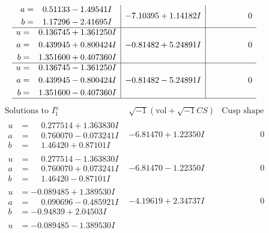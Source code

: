 \documentclass[1p]{elsarticle_modified}
\theoremstyle{definition}
\newcommand{\I}{\sqrt{-1}}
\begin{document}
$$\begin{array}{c|c|c}
\begin{aligned}
a &= \phantom{-}0.51133 - 1.49541 I \\
b &= \phantom{-}1.17296 - 2.41695 I\end{aligned}
 & -7.10395 + 1.14182 I & \phantom{-0.000000 } 0 \\ \hline\begin{aligned}
u &= \phantom{-}0.136745 + 1.361250 I \\
a &= \phantom{-}0.439945 + 0.800424 I \\
b &= \phantom{-}1.351600 + 0.407360 I\end{aligned}
 & -0.81482 + 5.24891 I & \phantom{-0.000000 } 0 \\ \hline\begin{aligned}
u &= \phantom{-}0.136745 - 1.361250 I \\
a &= \phantom{-}0.439945 - 0.800424 I \\
b &= \phantom{-}1.351600 - 0.407360 I\end{aligned}
 & -0.81482 - 5.24891 I & \phantom{-0.000000 } 0\\
 \hline 
 \end{array}$$\newpage$$\begin{array}{c|c|c}  
\text{Solutions to }I^u_{1}& \I (\text{vol} + \sqrt{-1}CS) & \text{Cusp shape}\\
 \hline 
\begin{aligned}
u &= \phantom{-}0.277514 + 1.363830 I \\
a &= \phantom{-}0.760070 - 0.073241 I \\
b &= \phantom{-}1.46420 + 0.87101 I\end{aligned}
 & -6.81470 + 1.22350 I & \phantom{-0.000000 } 0 \\ \hline\begin{aligned}
u &= \phantom{-}0.277514 - 1.363830 I \\
a &= \phantom{-}0.760070 + 0.073241 I \\
b &= \phantom{-}1.46420 - 0.87101 I\end{aligned}
 & -6.81470 - 1.22350 I & \phantom{-0.000000 } 0 \\ \hline\begin{aligned}
u &= -0.089485 + 1.389530 I \\
a &= \phantom{-}0.090696 - 0.485921 I \\
b &= -0.94839 + 2.04503 I\end{aligned}
 & -4.19619 + 2.34737 I & \phantom{-0.000000 } 0 \\ \hline\begin{aligned}
u &= -0.089485 - 1.389530 I \\

\end{aligned}
\end{array}$$
\end{document}
